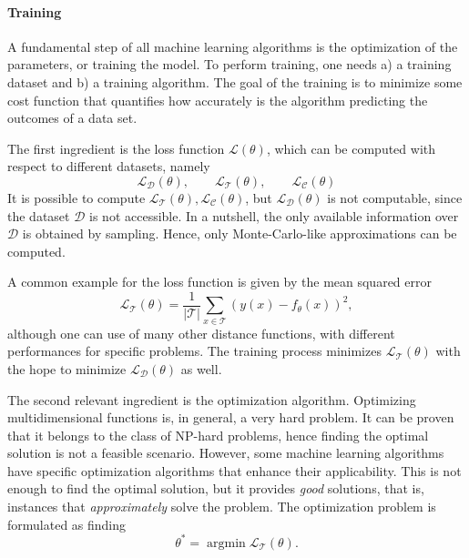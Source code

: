 \documentclass[]{report}
\begin{document}
\paragraph{Training} A fundamental step of all machine learning algorithms is the optimization of the parameters, or training the model. To perform training, one needs a) a training dataset and b) a training algorithm. The goal of the training is to minimize some cost function that quantifies how accurately is the algorithm predicting the outcomes of a data set. 

The first ingredient is the loss function $\mathcal L(\theta)$, which can be computed with respect to different datasets, namely
\begin{equation}
    \mathcal L_{\mathcal D}(\theta), \qquad \mathcal L_{\mathcal T}(\theta), \qquad \mathcal L_{\mathcal C}(\theta)
\end{equation}
It is possible to compute $\mathcal L_{\mathcal T}(\theta), \mathcal L_{\mathcal C}(\theta)$, but $\mathcal L_{\mathcal D}(\theta)$ is not computable, since the dataset $\mathcal D$ is not accessible. In a nutshell, the only available information over $\mathcal D$ is obtained by sampling. Hence, only Monte-Carlo-like approximations can be computed. 

A common example for the loss function is given by the mean squared error
\begin{equation}
    \mathcal L_{\mathcal T}(\theta) = \frac{1}{\vert \mathcal T \vert} \sum_{x \in \mathcal T} (y(x) - f_\theta(x))^2, 
\end{equation}
although one can use of many other distance functions, with different performances for specific problems. The training process minimizes $\mathcal L_{\mathcal T}(\theta)$ with the hope to minimize $\mathcal L_{\mathcal D}(\theta)$ as well. 

The second relevant ingredient is the optimization algorithm. Optimizing multidimensional functions is, in general, a very hard problem. It can be proven that it belongs to the class of NP-hard problems, hence finding the optimal solution is not a feasible scenario. However, some machine learning algorithms have specific optimization algorithms that enhance their applicability. This is not enough to find the optimal solution, but it provides \textit{good} solutions, that is, instances that \textit{approximately} solve the problem. 
The optimization problem is formulated as finding
\begin{equation}
\theta^* = \operatorname{argmin} \mathcal L_{\mathcal T}(\theta).
\end{equation}
\end{document}
